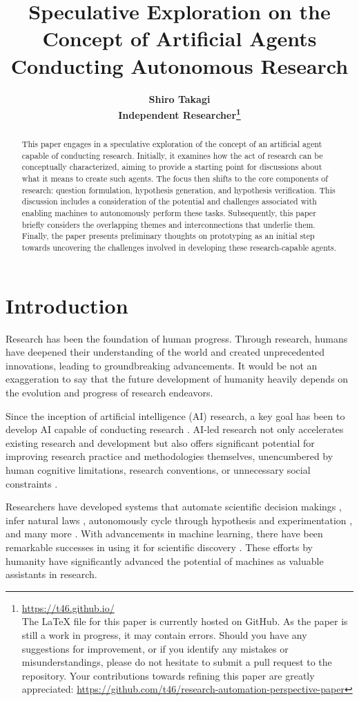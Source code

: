 \documentclass{article}
\title{\bfseries Speculative Exploration on the Concept of Artificial Agents Conducting Autonomous Research}
\author{\normalsize \bfseries Shiro Takagi \\
\normalsize Independent Researcher\footnote{\href{https://t46.github.io/}{https://t46.github.io/} \\
The LaTeX file for this paper is currently hosted on GitHub. As the paper is still a work in progress, it may contain errors. Should you have any suggestions for improvement, or if you identify any mistakes or misunderstandings, please do not hesitate to submit a pull request to the repository. Your contributions towards refining this paper are greatly appreciated: \href{https://github.com/t46/research-automation-perspective-paper}{https://github.com/t46/research-automation-perspective-paper} }}
\date{}
\begin{document}
\sloppy
\maketitle


\begin{abstract}
This paper engages in a speculative exploration of the concept of an artificial agent capable of conducting research. Initially, it examines how the act of research can be conceptually characterized, aiming to provide a starting point for discussions about what it means to create such agents. The focus then shifts to the core components of research: question formulation, hypothesis generation, and hypothesis verification. This discussion includes a consideration of the potential and challenges associated with enabling machines to autonomously perform these tasks. Subsequently, this paper briefly considers the overlapping themes and interconnections that underlie them. Finally, the paper presents preliminary thoughts on prototyping as an initial step towards uncovering the challenges involved in developing these research-capable agents.
\end{abstract}

\tableofcontents

\section{Introduction}
Research has been the foundation of human progress. Through research, humans have deepened their understanding of the world and created unprecedented innovations, leading to groundbreaking advancements. It would be not an exaggeration to say that the future development of humanity heavily depends on the evolution and progress of research endeavors.

Since the inception of artificial intelligence (AI) research, a key goal has been to develop AI capable of conducting research \cite{zenil2023future}. AI-led research not only accelerates existing research and development but also offers significant potential for improving research practice and methodologies themselves, unencumbered by human cognitive limitations, research conventions, or unnecessary social constraints \cite{zenil2023future,kitano2021nobel}.

Researchers have developed systems that automate scientific decision makings \cite{lindsay1993dendral}, infer natural laws \cite{langley1987scientific}, autonomously cycle through hypothesis and experimentation \cite{king2004functional}, and many more \cite{zenil2023future,zenil2023}. With advancements in machine learning, there have been remarkable successes in using it for scientific discovery \cite{wang2023scientific,xu2021artificial,zhang2023artificial,ai4science2023impact}. These efforts by humanity have significantly advanced the potential of machines as valuable assistants in research.
\end{document}

